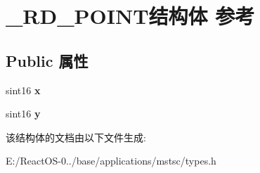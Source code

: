 \hypertarget{struct___r_d___p_o_i_n_t}{}\section{\+\_\+\+R\+D\+\_\+\+P\+O\+I\+N\+T结构体 参考}
\label{struct___r_d___p_o_i_n_t}
\subsection*{Public 属性}
\begin{DoxyCompactItemize}
\item 
\mbox{\label{struct___r_d___p_o_i_n_t_ad450967e4835fbadd973b1b6238affd5}} 
sint16 {\bfseries x}
\item 
\mbox{\label{struct___r_d___p_o_i_n_t_adb69a9cd525a18cbb51c8643b9a26df8}} 
sint16 {\bfseries y}
\end{DoxyCompactItemize}


该结构体的文档由以下文件生成\+:\begin{DoxyCompactItemize}
\item 
E\+:/\+React\+O\+S-\/0../base/applications/mstsc/types.\+h\end{DoxyCompactItemize}
